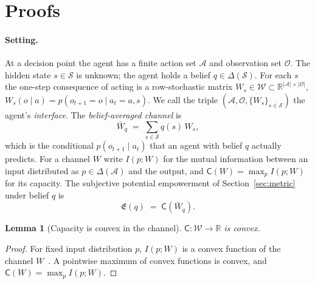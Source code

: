 \documentclass[letterpaper]{article} %
\newtheorem{lemma}{Lemma}
\theoremstyle{definition}
\providecommand{\R}{\mathbb{R}}
\providecommand{\cA}{\mathcal{A}}
\providecommand{\cO}{\mathcal{O}}
\providecommand{\cS}{\mathcal{S}}
\providecommand{\cW}{\mathcal{W}}
\providecommand{\Emp}{\mathfrak{E}}
\providecommand{\Capa}{\mathsf{C}}
\begin{document}
\newpage


\appendix
\section{Proofs}\label{app:proofs}

\paragraph{Setting.}
At a decision point the agent has a finite action set $\cA$ and observation set $\cO$. The hidden state $s \in \cS$ is unknown; the agent holds a belief $q \in \Delta(\cS)$. For each $s$ the one-step consequence of acting is a row-stochastic matrix $W_s \in \cW \subset \R^{|\cA| \times |\cO|}$, $W_s(o \mid a) = p(o_{t+1} = o \mid a_t = a, s)$. We call the triple $(\cA, \cO, \{W_s\}_{s \in \cS})$ the agent's \emph{interface}. The \emph{belief-averaged channel} is
\begin{equation}
  \bar W_q \;=\; \sum_{s \in \cS} q(s)\, W_s ,
  \label{eq:mixed}
\end{equation}
which is the conditional $p(o_{t+1} \mid a_t)$ that an agent with belief $q$ actually predicts. For a channel $W$ write $I(p; W)$ for the mutual information between an input distributed as $p \in \Delta(\cA)$ and the output, and $\Capa(W) = \max_{p} I(p; W)$ for its capacity. The subjective potential empowerment of Section~\ref{sec:metric} under belief $q$ is
\begin{equation}
  \Emp(q) \;=\; \Capa(\bar W_q).
  \label{eq:emp}
\end{equation}

\begin{lemma}[Capacity is convex in the channel]
\label{lem:convex}
$\Capa : \cW \to \R$ is convex.
\end{lemma}
\begin{proof}
For fixed input distribution $p$, $I(p; W)$ is a convex function of the channel $W$~\citep[Theorem~2.7.4]{coverElementsInformationTheory2006}. A pointwise maximum of convex functions is convex, and $\Capa(W) = \max_p I(p; W)$.
\end{proof}
\end{document}
